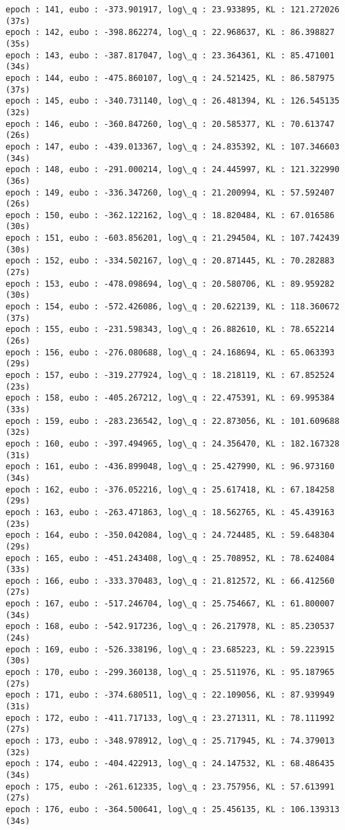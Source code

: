 \documentclass[11pt]{article}
\begin{document}
\begin{Verbatim}[commandchars=\\\{\}]
epoch : 141, eubo : -373.901917, log\_q : 23.933895, KL : 121.272026 (37s)
epoch : 142, eubo : -398.862274, log\_q : 22.968637, KL : 86.398827 (35s)
epoch : 143, eubo : -387.817047, log\_q : 23.364361, KL : 85.471001 (34s)
epoch : 144, eubo : -475.860107, log\_q : 24.521425, KL : 86.587975 (37s)
epoch : 145, eubo : -340.731140, log\_q : 26.481394, KL : 126.545135 (32s)
epoch : 146, eubo : -360.847260, log\_q : 20.585377, KL : 70.613747 (26s)
epoch : 147, eubo : -439.013367, log\_q : 24.835392, KL : 107.346603 (34s)
epoch : 148, eubo : -291.000214, log\_q : 24.445997, KL : 121.322990 (36s)
epoch : 149, eubo : -336.347260, log\_q : 21.200994, KL : 57.592407 (26s)
epoch : 150, eubo : -362.122162, log\_q : 18.820484, KL : 67.016586 (30s)
epoch : 151, eubo : -603.856201, log\_q : 21.294504, KL : 107.742439 (30s)
epoch : 152, eubo : -334.502167, log\_q : 20.871445, KL : 70.282883 (27s)
epoch : 153, eubo : -478.098694, log\_q : 20.580706, KL : 89.959282 (30s)
epoch : 154, eubo : -572.426086, log\_q : 20.622139, KL : 118.360672 (37s)
epoch : 155, eubo : -231.598343, log\_q : 26.882610, KL : 78.652214 (26s)
epoch : 156, eubo : -276.080688, log\_q : 24.168694, KL : 65.063393 (29s)
epoch : 157, eubo : -319.277924, log\_q : 18.218119, KL : 67.852524 (23s)
epoch : 158, eubo : -405.267212, log\_q : 22.475391, KL : 69.995384 (33s)
epoch : 159, eubo : -283.236542, log\_q : 22.873056, KL : 101.609688 (32s)
epoch : 160, eubo : -397.494965, log\_q : 24.356470, KL : 182.167328 (31s)
epoch : 161, eubo : -436.899048, log\_q : 25.427990, KL : 96.973160 (34s)
epoch : 162, eubo : -376.052216, log\_q : 25.617418, KL : 67.184258 (29s)
epoch : 163, eubo : -263.471863, log\_q : 18.562765, KL : 45.439163 (23s)
epoch : 164, eubo : -350.042084, log\_q : 24.724485, KL : 59.648304 (29s)
epoch : 165, eubo : -451.243408, log\_q : 25.708952, KL : 78.624084 (33s)
epoch : 166, eubo : -333.370483, log\_q : 21.812572, KL : 66.412560 (27s)
epoch : 167, eubo : -517.246704, log\_q : 25.754667, KL : 61.800007 (34s)
epoch : 168, eubo : -542.917236, log\_q : 26.217978, KL : 85.230537 (24s)
epoch : 169, eubo : -526.338196, log\_q : 23.685223, KL : 59.223915 (30s)
epoch : 170, eubo : -299.360138, log\_q : 25.511976, KL : 95.187965 (27s)
epoch : 171, eubo : -374.680511, log\_q : 22.109056, KL : 87.939949 (31s)
epoch : 172, eubo : -411.717133, log\_q : 23.271311, KL : 78.111992 (27s)
epoch : 173, eubo : -348.978912, log\_q : 25.717945, KL : 74.379013 (32s)
epoch : 174, eubo : -404.422913, log\_q : 24.147532, KL : 68.486435 (34s)
epoch : 175, eubo : -261.612335, log\_q : 23.757956, KL : 57.613991 (27s)
epoch : 176, eubo : -364.500641, log\_q : 25.456135, KL : 106.139313 (34s)

\end{Verbatim}
\end{document}
